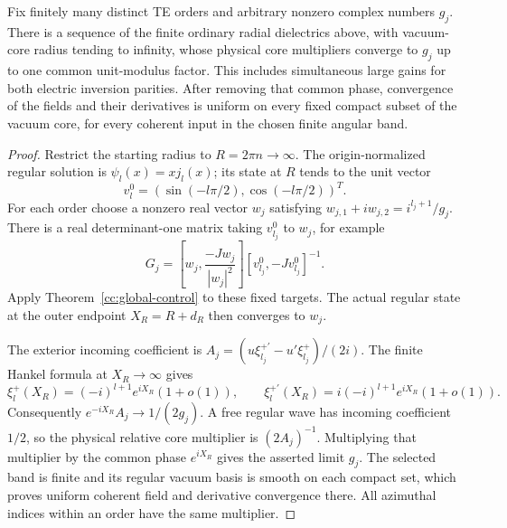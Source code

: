 \begin{corollary}
\label{cc:core-gains}
Fix finitely many distinct TE orders and arbitrary nonzero complex
numbers $g_j$. There is a sequence of the finite ordinary radial
dielectrics above, with vacuum-core radius tending to infinity,
whose physical core multipliers converge to $g_j$ up to one
common unit-modulus factor. This includes simultaneous large gains
for both electric inversion parities. After removing that common
phase, convergence of the fields and their derivatives is uniform
on every fixed compact subset of the vacuum core, for every
coherent input in the chosen finite angular band.
\end{corollary}
\begin{proof}
Restrict the starting radius to $R=2\pi n\to\infty$.
The origin-normalized regular solution is $\psi_l(x)=xj_l(x)$;
its state at $R$ tends to the unit vector
\[
 v_l^0=(\sin(-l\pi/2),\cos(-l\pi/2))^T .
\]
For each order choose a nonzero real vector $w_j$ satisfying
$w_{j,1}+iw_{j,2}=i^{l_j+1}/g_j$.
There is a real determinant-one matrix taking $v_{l_j}^0$
to $w_j$, for example
\[
 G_j=
 \left[w_j,\frac{-Jw_j}{|w_j|^2}\right]
 \left[v_{l_j}^0,-Jv_{l_j}^0\right]^{-1}.
\]
Apply Theorem~\ref{cc:global-control} to these fixed targets.
The actual regular state at the outer endpoint $X_R=R+d_R$
then converges to $w_j$.

The exterior incoming coefficient is
$A_j=(u\xi_{l_j}^{+\prime}-u'\xi_{l_j}^+)/(2i)$.
The finite Hankel formula at $X_R\to\infty$ gives
\[
 \xi_l^+(X_R)=(-i)^{l+1}e^{iX_R}(1+o(1)),\qquad
 \xi_l^{+\prime}(X_R)=i(-i)^{l+1}e^{iX_R}(1+o(1)).
\]
Consequently
$e^{-iX_R}A_j\to1/(2g_j)$.
A free regular wave has incoming coefficient $1/2$, so the
physical relative core multiplier is $(2A_j)^{-1}$.
Multiplying that multiplier by the common phase $e^{iX_R}$
gives the asserted limit $g_j$. The selected band is finite and
its regular vacuum basis is smooth on each compact set, which
proves uniform coherent field and derivative convergence there.
All azimuthal indices within an order have the same multiplier.
\end{proof}

